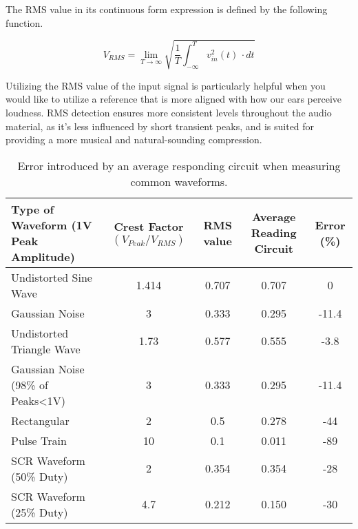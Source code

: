 \documentclass[10pt]{article}
\begin{document}
\begin{multicols*}{2}
                    The RMS value in its continuous form expression is defined by the following function. \cite{aes-that-rms}
                    
                    \begin{equation}
                        V_{RMS} = \lim_{T \to \infty}\sqrt{\frac{1}{T}\int_{-\infty}^{T} v_{in}^2(t) \,\cdot dt}
                    \end{equation}
                    
                    Utilizing the RMS value of the input signal is particularly helpful when you would like to utilize a reference that is more aligned with how our ears perceive loudness. RMS detection ensures more consistent levels throughout the audio material, as it's less influenced by short transient peaks, and is suited for providing a more musical and natural-sounding compression.

                    \begin{table*}[!th]
                        \centering
                        \begin{tabularx}{\textwidth}{|l*{4}{|C}|}
                            \hline
                            Type of Waveform (1V Peak Amplitude) & Crest Factor $(V_{Peak}/V_{RMS})$ & RMS value & Average Reading Circuit & Error (\%) \\ \hline
                            Undistorted Sine Wave & 1.414 & 0.707 & 0.707 & 0 \\    \hline
                            Gaussian Noise & 3 & 0.333 & 0.295 & -11.4 \\   \hline
                            Undistorted Triangle Wave & 1.73 & 0.577 & 0.555 & -3.8 \\   \hline
                            Gaussian Noise (98\% of Peaks<1V) & 3 & 0.333 & 0.295 & -11.4 \\    \hline
                            Rectangular & 2 & 0.5 & 0.278 & -44 \\    \hline
                            Pulse Train & 10 & 0.1 & 0.011 & -89 \\    \hline
                            SCR Waveform (50\% Duty) & 2 & 0.354 & 0.354 & -28 \\    \hline
                            SCR Waveform (25\% Duty) & 4.7 & 0.212 & 0.150 & -30 \\    \hline
                        \end{tabularx}
                        \caption{Error introduced by an average responding circuit when measuring common waveforms.}
                        \label{table:ave-err}
                    \end{table*}
                    

\end{multicols*}
\end{document}
